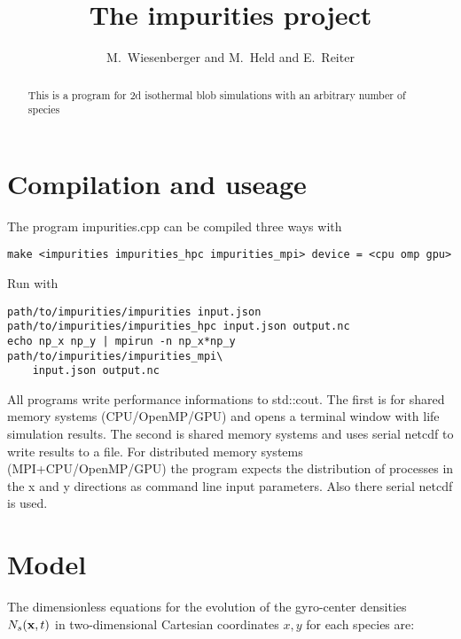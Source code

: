 


\usepackage{minted}
\newcommand{\ns}{\ensuremath{{N_s} }}
\newcommand{\physs}{\ensuremath{{n_s} }}



\title{The impurities project}
\author{ M.~Wiesenberger and M.~Held and E.~Reiter}
\maketitle

\begin{abstract}
  This is a program for 2d isothermal blob simulations with an arbitrary number of species
\end{abstract}
\tableofcontents

\section{Compilation and useage}
The program impurities.cpp can be compiled three ways with
\begin{verbatim}
make <impurities impurities_hpc impurities_mpi> device = <cpu omp gpu>
\end{verbatim}
Run with
\begin{verbatim}
path/to/impurities/impurities input.json
path/to/impurities/impurities_hpc input.json output.nc
echo np_x np_y | mpirun -n np_x*np_y path/to/impurities/impurities_mpi\
    input.json output.nc
\end{verbatim}
All programs write performance informations to std::cout.
The first is for shared memory systems (CPU/OpenMP/GPU) and opens a terminal window with life simulation results.
 The
second is shared memory systems and uses serial netcdf
to write results to a file.
For distributed
memory systems (MPI+CPU/OpenMP/GPU) the program expects the distribution of processes in the
x and y directions as command line input parameters. Also there serial netcdf is used.

\section{Model}

The dimensionless equations for the evolution of the gyro-center
densities $\ns({\bf x},t)$ in two-dimensional Cartesian coordinates $x,y$ for each species are:

